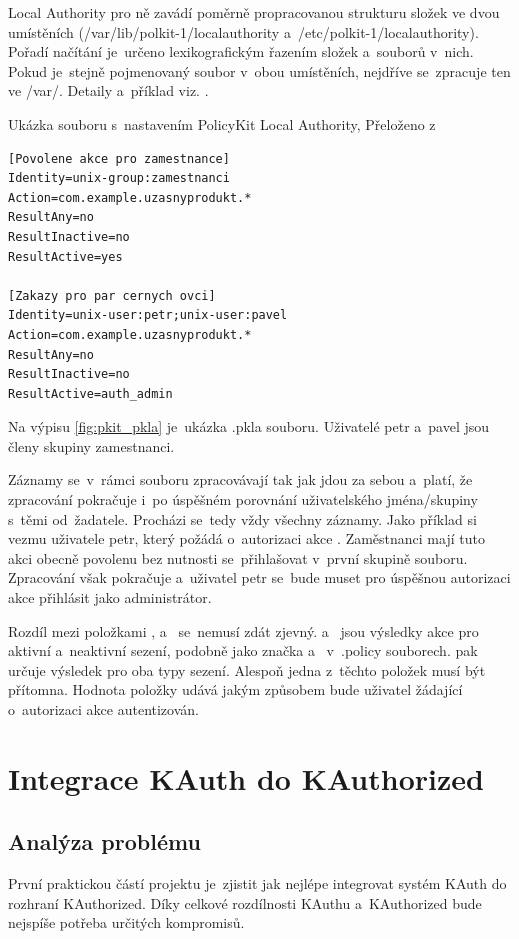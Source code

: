 Local Authority pro ně zavádí poměrně propracovanou strukturu složek ve dvou umístěních (/var/lib/polkit-1/localauthority a~/etc/polkit-1/localauthority). Pořadí načítání je~určeno lexikografickým řazením složek a~souborů v~nich. Pokud je~stejně pojmenovaný soubor v~obou umístěních, nejdříve se~zpracuje ten ve /var/. Detaily a~příklad viz. \cite{manpklocalauth}.

\begin{mylisting}
\caption{Ukázka souboru s~nastavením PolicyKit Local Authority, Přeloženo z~\cite{manpklocalauth}}
\label{fig:pkit_pkla}
\begin{lstlisting}
[Povolene akce pro zamestnance]
Identity=unix-group:zamestnanci
Action=com.example.uzasnyprodukt.*
ResultAny=no
ResultInactive=no
ResultActive=yes

[Zakazy pro par cernych ovci]
Identity=unix-user:petr;unix-user:pavel
Action=com.example.uzasnyprodukt.*
ResultAny=no
ResultInactive=no
ResultActive=auth_admin
\end{lstlisting}
\end{mylisting}

Na výpisu \ref{fig:pkit_pkla} je~ukázka .pkla souboru. Uživatelé petr a~pavel jsou členy skupiny zamestnanci.

Záznamy se~v~rámci souboru zpracovávají tak jak jdou za sebou a~platí, že zpracování pokračuje i~po úspěšném porovnání uživatelského jména/skupiny s~těmi od~žadatele. Procházi se~tedy vždy všechny záznamy. Jako příklad si vezmu uživatele petr, který požádá o~autorizaci akce . Zaměstnanci mají tuto akci obecně povolenu bez nutnosti se~přihlašovat v~první skupině souboru. Zpracování však pokračuje a~uživatel petr se~bude muset pro úspěšnou autorizaci akce přihlásit jako administrátor.

Rozdíl mezi položkami ,  a~ se~nemusí zdát zjevný.  a~ jsou výsledky akce pro aktivní a~neaktivní sezení, podobně jako značka  a~ v~.policy souborech.  pak určuje výsledek pro oba typy sezení. Alespoň jedna z~těchto položek musí být přítomna. Hodnota položky udává jakým způsobem bude uživatel žádající o~autorizaci akce autentizován.

\chapter{Integrace KAuth do KAuthorized}
\section{Analýza problému}
První praktickou částí projektu je~zjistit jak nejlépe integrovat systém KAuth do rozhraní KAuthorized. Díky celkové rozdílnosti KAuthu a~KAuthorized bude nejspíše potřeba určitých kompromisů.

